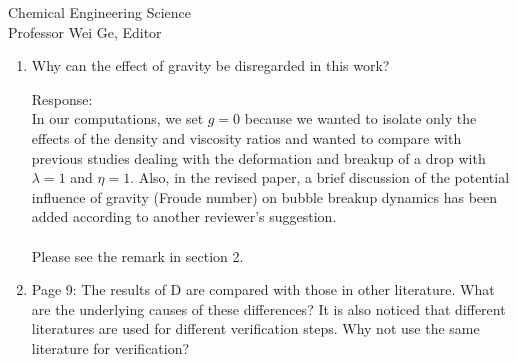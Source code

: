 \documentclass{letter}
\begin{document}
\begin{letter}{
Chemical Engineering Science\\
Professor Wei Ge, Editor\\}
\begin{enumerate}
Response: \\
We have improved the introduction and section 3.1 in order to make it more clear about our rationale for using the CLSVOF method to capture complex deforming boundaries and also why we represent the gas-liquid interface as ideally sharp.  Also, we have already applied the CLSVOF method in past work to many multiphase flow problems with complex interface deformations.  Please see the top of section 3.2 in which we list past research in which we have obtained nice results for hard multiphase flow problems using the CLSVOF method.  \\

\par\noindent
\item
\textsf
{Why can the effect of gravity be disregarded in this work?\\}
\vspace{3 mm}

Response: \\
In our computations, we set $g = 0$ because we wanted to isolate only the effects of the density and viscosity ratios and 
wanted to compare with previous studies dealing with the deformation and breakup of a drop with $\lambda =1$ and $\eta = 1$. 
Also, in the revised paper, a brief discussion of the potential influence of gravity (Froude number) on bubble breakup dynamics 
has been added according to another reviewer's suggestion.\\ \\
Please see the remark in section 2.  \\

\par\noindent
\item
\textsf
{Page 9: The results of D are compared with those in other literature. 
What are the underlying causes of these differences? It is also noticed that different literatures are used for different verification steps.
Why not use the same literature for verification?}
\vspace{3 mm}


\end{enumerate}
\end{letter}
\end{document}

